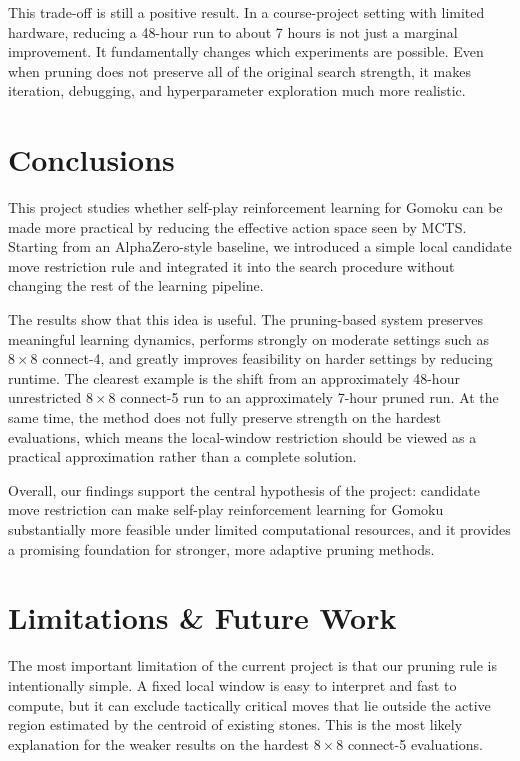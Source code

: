 \documentclass{article}
\begin{document}
This trade-off is still a positive result. In a course-project setting with limited hardware, reducing a 48-hour run to about 7 hours is not just a marginal improvement. It fundamentally changes which experiments are possible. Even when pruning does not preserve all of the original search strength, it makes iteration, debugging, and hyperparameter exploration much more realistic.

\section{Conclusions}

This project studies whether self-play reinforcement learning for Gomoku can be made more practical by reducing the effective action space seen by MCTS. Starting from an AlphaZero-style baseline, we introduced a simple local candidate move restriction rule and integrated it into the search procedure without changing the rest of the learning pipeline.

The results show that this idea is useful. The pruning-based system preserves meaningful learning dynamics, performs strongly on moderate settings such as \(8 \times 8\) connect-4, and greatly improves feasibility on harder settings by reducing runtime. The clearest example is the shift from an approximately 48-hour unrestricted \(8 \times 8\) connect-5 run to an approximately 7-hour pruned run. At the same time, the method does not fully preserve strength on the hardest evaluations, which means the local-window restriction should be viewed as a practical approximation rather than a complete solution.

Overall, our findings support the central hypothesis of the project: candidate move restriction can make self-play reinforcement learning for Gomoku substantially more feasible under limited computational resources, and it provides a promising foundation for stronger, more adaptive pruning methods.

\section{Limitations \& Future Work}

The most important limitation of the current project is that our pruning rule is intentionally simple. A fixed local window is easy to interpret and fast to compute, but it can exclude tactically critical moves that lie outside the active region estimated by the centroid of existing stones. This is the most likely explanation for the weaker results on the hardest \(8 \times 8\) connect-5 evaluations.
\end{document}
